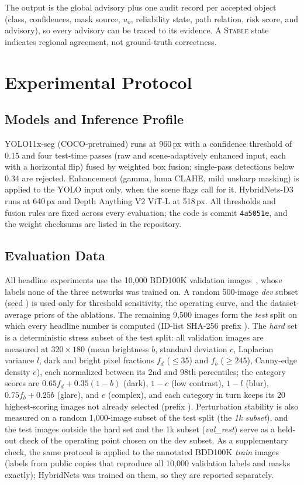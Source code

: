 \documentclass[conference,a4paper]{IEEEtran}
\renewcommand{\CodeCommit}{4a5051e}
\newcommand{\st}[1]{\textsc{#1}}
\begin{document}
The output is the global advisory plus one audit record per accepted object (class, confidences, mask source, $u_o$, reliability state, path relation, risk score, and advisory), so every advisory can be traced to its evidence. A \st{Stable} state indicates regional agreement, not ground-truth correctness.

\section{Experimental Protocol}
\subsection{Models and Inference Profile}
YOLO11x-seg (COCO-pretrained) runs at 960\,px with a confidence threshold of 0.15 and four test-time passes (raw and scene-adaptively enhanced input, each with a horizontal flip) fused by weighted box fusion; single-pass detections below 0.34 are rejected. Enhancement (gamma, luma CLAHE, mild unsharp masking) is applied to the YOLO input only, when the scene flags call for it. HybridNets-D3 runs at 640\,px and Depth Anything V2 ViT-L at 518\,px. All thresholds and fusion rules are fixed across every evaluation; the code is commit \texttt{\CodeCommit}, and the weight checksums are listed in the repository.

\subsection{Evaluation Data}
All headline experiments use the 10{,}000 BDD100K validation images~\cite{bdd100k}, whose labels none of the three networks was trained on. A random 500-image \emph{dev} subset (seed \SplitSeed) is used only for threshold sensitivity, the operating curve, and the dataset-average priors of the ablations. The remaining 9{,}500 images form the \emph{test} split on which every headline number is computed (ID-list SHA-256 prefix \texttt{\TestIDsHash}). The \emph{hard} set is a deterministic stress subset of the test split: all validation images are measured at $320\times180$ (mean brightness $b$, standard deviation $c$, Laplacian variance $l$, dark and bright pixel fractions $f_d$ ($\le35$) and $f_b$ ($\ge245$), Canny-edge density $e$), each normalized between its 2nd and 98th percentiles; the category scores are $0.65f_d+0.35(1-b)$ (dark), $1-c$ (low contrast), $1-l$ (blur), $0.75f_b+0.25b$ (glare), and $e$ (complex), and each category in turn keeps its 20 highest-scoring images not already selected (prefix \texttt{\HardIDsHash}). Perturbation stability is also measured on a random 1{,}000-image subset of the test split (the \emph{1k subset})\ifdefined\OpValopImages, and the \OpValopImages{} test images outside the hard set and the 1k subset (\emph{val\_rest}) serve as a held-out check of the operating point chosen on the dev subset\fi.\ifdefined\TrainImages{} As a supplementary check, the same protocol is applied to the \TrainImages{} annotated BDD100K \emph{train} images (labels from public copies that reproduce all 10{,}000 validation labels and masks exactly); HybridNets was trained on them, so they are reported separately.\fi
\end{document}
